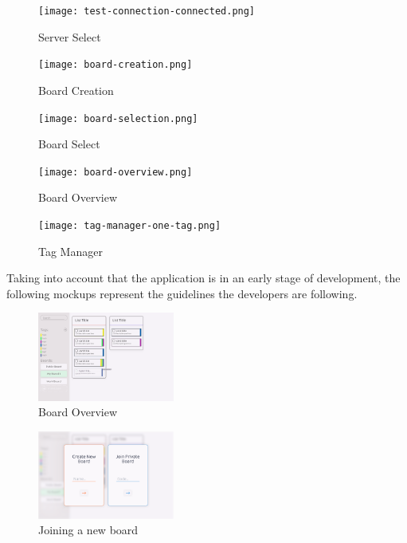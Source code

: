 \begin{figure}[H]
    \centering
    \texttt{[image: test-connection-connected.png]}
    \caption{Server Select}
    \label{fig:server}
\end{figure}

\begin{figure}[H]
    \centering
    \texttt{[image: board-creation.png]}
    \caption{Board Creation}
    \label{fig:board-create}
\end{figure}

\begin{figure}[H]
    \centering
    \texttt{[image: board-selection.png]}
    \caption{Board Select}
    \label{fig:board-select}
\end{figure}

\begin{figure}[H]
    \centering
    \texttt{[image: board-overview.png]}
    \caption{Board Overview}
    \label{fig:board-overview}
\end{figure}

\begin{figure}[H]
    \centering
    \texttt{[image: tag-manager-one-tag.png]}
    \caption{Tag Manager}
    \label{fig:tags}
\end{figure}

Taking into account that the application is in an early stage of development, the following mockups represent the guidelines the developers are following.

\begin{figure}[H]
    \centering
    \includegraphics[width=0.4\textwidth]{mockup-1.png}
    \caption{Board Overview}
    \label{fig:mockup-overview}
\end{figure}

\begin{figure}[H]
    \centering
    \includegraphics[width=0.4\textwidth]{mockup-2.png}
    \caption{Joining a new board}
    \label{fig:mockup-join}
\end{figure}